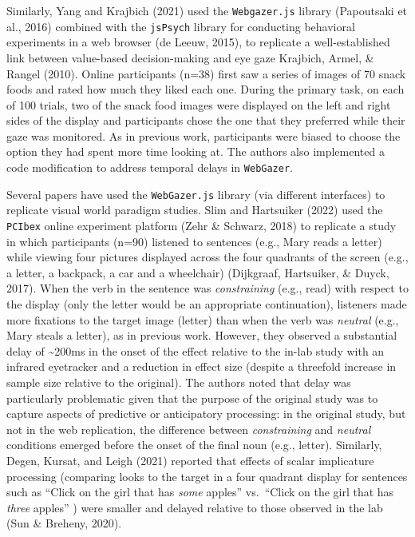 \documentclass[
  man,floatsintext]{apa6}
\begin{document}
Similarly, Yang and Krajbich (2021) used the \texttt{Webgazer.js} library (Papoutsaki et al., 2016) combined with the \texttt{jsPsych} library for conducting behavioral experiments in a web browser (de Leeuw, 2015), to replicate a well-established link between value-based decision-making and eye gaze Krajbich, Armel, \& Rangel (2010). Online participants (n=38) first saw a series of images of 70 snack foods and rated how much they liked each one. During the primary task, on each of 100 trials, two of the snack food images were displayed on the left and right sides of the display and participants chose the one that they preferred while their gaze was monitored. As in previous work, participants were biased to choose the option they had spent more time looking at. The authors also implemented a code modification to address temporal delays in \texttt{WebGazer}.

Several papers have used the \texttt{WebGazer.js} library (via different interfaces) to replicate visual world paradigm studies. Slim and Hartsuiker (2022) used the \texttt{PCIbex} online experiment platform (Zehr \& Schwarz, 2018) to replicate a study in which participants (n=90) listened to sentences (e.g., Mary reads a letter) while viewing four pictures displayed across the four quadrants of the screen (e.g., a letter, a backpack, a car and a wheelchair) (Dijkgraaf, Hartsuiker, \& Duyck, 2017). When the verb in the sentence was \emph{constraining} (e.g., read) with respect to the display (only the letter would be an appropriate continuation), listeners made more fixations to the target image (letter) than when the verb was \emph{neutral} (e.g., Mary steals a letter), as in previous work. However, they observed a substantial delay of \textasciitilde200ms in the onset of the effect relative to the in-lab study with an infrared eyetracker and a reduction in effect size (despite a threefold increase in sample size relative to the original). The authors noted that delay was particularly problematic given that the purpose of the original study was to capture aspects of predictive or anticipatory processing: in the original study, but not in the web replication, the difference between \emph{constraining} and \emph{neutral} conditions emerged before the onset of the final noun (e.g., letter). Similarly, Degen, Kursat, and Leigh (2021) reported that effects of scalar implicature processing (comparing looks to the target in a four quadrant display for sentences such as ``Click on the girl that has \emph{some} apples'' vs.~``Click on the girl that has \emph{three} apples'' ) were smaller and delayed relative to those observed in the lab (Sun \& Breheny, 2020).
\end{document}
